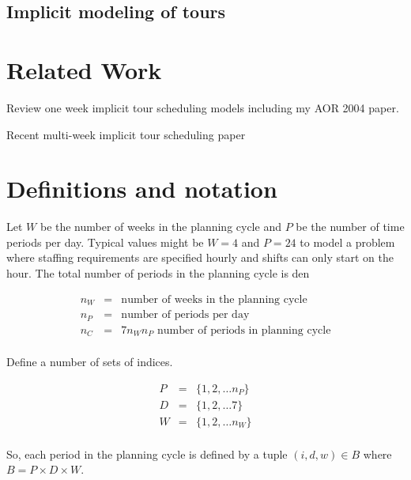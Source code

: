 \subsection{Implicit modeling of tours}




\section{Related Work}
\label{sec-relatedwork}
Review one week implicit tour scheduling models including my AOR 2004 paper.

Recent multi-week implicit tour scheduling paper

 





\section{Definitions and notation}
\label{sec-mwts}


Let $W$ be the number of weeks in the planning cycle and $P$ be the number of time periods per day. Typical values might be $W=4$ and $P=24$ to model a problem where staffing requirements are specified hourly and shifts can only start on the hour. The total number of periods in the planning cycle is den

\[
\begin{array}{lll}
n_W & = & \mbox{number of weeks in the planning cycle} \\
n_P & = & \mbox{number of periods per day} \\
n_C & = & 7 n_W n_P\mbox{ number of periods in planning cycle} \\
\end{array}
\]

Define a number of sets of indices.

\[
\begin{array}{lll}
P & = & \{1,2,\ldots n_P\} \\
D & = & \{1,2,\ldots 7\} \\
W & = & \{1,2,\ldots n_W\} \\
\end{array}
\]


So, each period in the planning cycle is defined by a tuple $(i,d,w) \in B$ where $B = P \times D \times W$.





